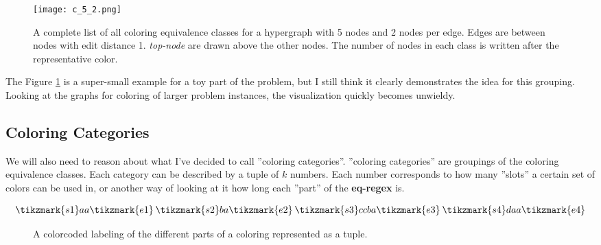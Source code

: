 \documentclass{article}
\begin{document}

\begin{figure}[h!]
  \texttt{[image: c\_5\_2.png]}
  \caption{A complete list of all coloring equivalence classes for a hypergraph with 5 nodes and 2 nodes per edge. Edges are between nodes with edit distance 1. \textit{top-node} are drawn above the other nodes. The number of nodes in each class is written after the representative color.}
  \label{fig:eqvClass}
\end{figure}

The Figure \ref{fig:eqvClass} is a super-small example for a toy part of the problem, but I still think it clearly demonstrates the idea for this grouping. Looking at the graphs for coloring of larger problem instances, the visualization quickly becomes unwieldy. 


\subsection{Coloring Categories}
We will also need to reason about what I've decided to call ''coloring categories''. ''coloring categories'' are groupings of the coloring equivalence classes.
Each category can be described by a tuple of $k$ numbers. Each number corresponds to how many ''slots'' a certain set of colors can be used in, or another way of looking at it how long each ''part'' of the \textbf{eq-regex} is.

\newpage
$$
  \tikzmark{s1}aa\tikzmark{e1} \hspace{0.2em} \tikzmark{s2}ba\tikzmark{e2} \hspace{0.2em} \tikzmark{s3}ccba\tikzmark{e3} \hspace{0.2em} \tikzmark{s4}daa\tikzmark{e4}
$$
\begin{figure}[h!]
  \caption{A colorcoded labeling of the different parts of a coloring represented as a tuple.}
  \label{fig:catColor}
\end{figure}
\end{document}

